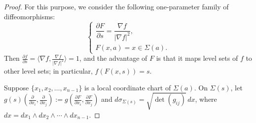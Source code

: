 \documentclass[a4, 12pt]{amsart}
\theoremstyle{plain}
\begin{document}
\begin{proof}
	For this purpose, we consider the following one-parameter family of diffeomorphisms:
	\begin{equation*}\label{eq:diffeomorphism}
		\begin{cases}
			\dfrac{\partial F}{\partial s} = \dfrac{\nabla f}{|\nabla f|^2}, \\[6pt]
			F(x, a) = x \in \Sigma(a).
		\end{cases}
	\end{equation*}
	Then $\frac{\partial f}{\partial s} = \langle\nabla f, \frac{\nabla f}{|\nabla f|^2}\rangle = 1$, and the advantage of $F$ is that it maps level sets of $f$ to other level sets; in particular, $f(F(x, s)) = s$.
	
	Suppose $\{x_1, x_2, \ldots, x_{n-1}\}$ is a local coordinate chart of $\Sigma(a)$. On $\Sigma(s)$, let $g(s)(\frac{\partial}{\partial x_i}, \frac{\partial}{\partial x_j}) := g(\frac{\partial F}{\partial x_i}, \frac{\partial F}{\partial x_j})$ and $d\sigma_{\Sigma(s)} = \sqrt{\det(g_{ij})}\,dx$, where $dx = dx_1 \wedge dx_2 \wedge \cdots \wedge dx_{n-1}$.
	

\end{proof}
\end{document}
